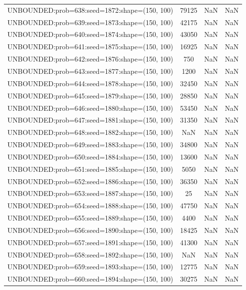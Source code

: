 \begin{longtable}{lccc}
UNBOUNDED:prob=638:seed=1872:shape=(150, 100) & 79125 &   NaN &    NaN \\
UNBOUNDED:prob=639:seed=1873:shape=(150, 100) & 42175 &   NaN &    NaN \\
UNBOUNDED:prob=640:seed=1874:shape=(150, 100) & 43050 &   NaN &    NaN \\
UNBOUNDED:prob=641:seed=1875:shape=(150, 100) & 16925 &   NaN &    NaN \\
UNBOUNDED:prob=642:seed=1876:shape=(150, 100) &   750 &   NaN &    NaN \\
UNBOUNDED:prob=643:seed=1877:shape=(150, 100) &  1200 &   NaN &    NaN \\
UNBOUNDED:prob=644:seed=1878:shape=(150, 100) & 32450 &   NaN &    NaN \\
UNBOUNDED:prob=645:seed=1879:shape=(150, 100) & 28850 &   NaN &    NaN \\
UNBOUNDED:prob=646:seed=1880:shape=(150, 100) & 53450 &   NaN &    NaN \\
UNBOUNDED:prob=647:seed=1881:shape=(150, 100) & 31350 &   NaN &    NaN \\
UNBOUNDED:prob=648:seed=1882:shape=(150, 100) &   NaN &   NaN &    NaN \\
UNBOUNDED:prob=649:seed=1883:shape=(150, 100) & 34800 &   NaN &    NaN \\
UNBOUNDED:prob=650:seed=1884:shape=(150, 100) & 13600 &   NaN &    NaN \\
UNBOUNDED:prob=651:seed=1885:shape=(150, 100) &  5050 &   NaN &    NaN \\
UNBOUNDED:prob=652:seed=1886:shape=(150, 100) & 36350 &   NaN &    NaN \\
UNBOUNDED:prob=653:seed=1887:shape=(150, 100) &    25 &   NaN &    NaN \\
UNBOUNDED:prob=654:seed=1888:shape=(150, 100) & 47750 &   NaN &    NaN \\
UNBOUNDED:prob=655:seed=1889:shape=(150, 100) &  4400 &   NaN &    NaN \\
UNBOUNDED:prob=656:seed=1890:shape=(150, 100) & 18425 &   NaN &    NaN \\
UNBOUNDED:prob=657:seed=1891:shape=(150, 100) & 41300 &   NaN &    NaN \\
UNBOUNDED:prob=658:seed=1892:shape=(150, 100) &   NaN &   NaN &    NaN \\
UNBOUNDED:prob=659:seed=1893:shape=(150, 100) & 12775 &   NaN &    NaN \\
UNBOUNDED:prob=660:seed=1894:shape=(150, 100) & 30275 &   NaN &    NaN \\

\end{longtable}
